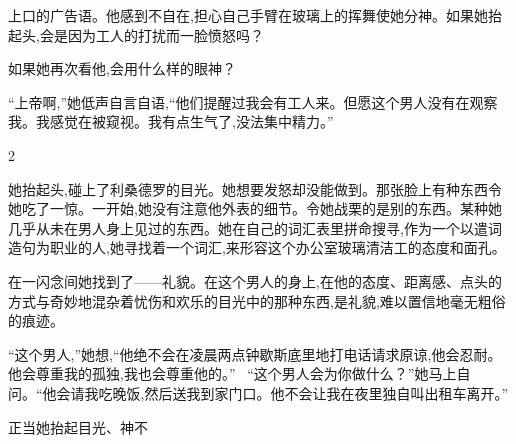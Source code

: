\documentclass{ctexart}
\renewcommand{\\}{\par}
\begin{document}
上口的广告语。他感到不自在,担心自己手臂在玻璃上的挥舞使她分神。如果她抬起头,会是因为工人的打扰而一脸愤怒吗？ \\如果她再次看他,会用什么样的眼神？ \\``上帝啊,''她低声自言自语,``他们提醒过我会有工人来。但愿这个男人没有在观察我。我感觉在被窥视。我有点生气了,没法集中精力。'' \\ \begin{center} 2 \end{center} \\她抬起头,碰上了利桑德罗的目光。她想要发怒却没能做到。那张脸上有种东西令她吃了一惊。一开始,她没有注意他外表的细节。令她战栗的是别的东西。某种她几乎从未在男人身上见过的东西。她在自己的词汇表里拼命搜寻,作为一个以遣词造句为职业的人,她寻找着一个词汇,来形容这个办公室玻璃清洁工的态度和面孔。\\在一闪念间她找到了——礼貌。在这个男人的身上,在他的态度、距离感、点头的方式与奇妙地混杂着忧伤和欢乐的目光中的那种东西,是礼貌,难以置信地毫无粗俗的痕迹。 \\“这个男人,”她想,“他绝不会在凌晨两点钟歇斯底里地打电话请求原谅,他会忍耐。他会尊重我的孤独,我也会尊重他的。” \ “这个男人会为你做什么？”她马上自问。“他会请我吃晚饭,然后送我到家门口。他不会让我在夜里独自叫出租车离开。” \\正当她抬起目光、神不
\end{document}
